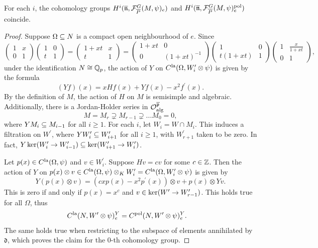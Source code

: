 \documentclass[10pt]{amsart}
\begin{document}
\begin{lemma}
For each $i$, the cohomology groups $H^{i}(\overline{\mathfrak{n}},\mathcal{F}_{\overline{P}}^{G}(M,\psi)_{e})$ and $H^{i}(\overline{\mathfrak{n}},\mathcal{F}_{\overline{P}}^{G}(M,\psi)^{\textnormal{pol}}_{e})$ coincide.
\end{lemma}
\begin{proof}
Suppose $\Omega\subseteq N$ is a compact open neighbourhood of $e$. Since \[
    \begin{pmatrix}
    1 & x \\ 0 & 1
    \end{pmatrix} \begin{pmatrix}
    1 & 0 \\ t & 1
    \end{pmatrix} = \begin{pmatrix}
    1+xt & x \\ t & 1
    \end{pmatrix} = \begin{pmatrix}
    1+xt & 0 \\ 0 & (1+xt)^{-1}
    \end{pmatrix} \begin{pmatrix}
    1 & 0 \\ t(1+xt) & 1
    \end{pmatrix} \begin{pmatrix}
    1 & \frac{x}{1+xt} \\ 0 & 1
    \end{pmatrix}, 
\] under the identification $N\cong \mathbb{Q}_{p}$, the action of $Y$ on $C^{\textnormal{la}}(\Omega,W^{\prime}_{i}\otimes\psi)$ is given by the formula \begin{equation}\label{eq:Y_action_formula}
    (Yf)(x) = xHf(x) + Yf(x) - x^{2}f^{\prime}(x). 
\end{equation} 
By the definition of $M$, the action of $H$ on $M$ is semisimple and algebraic. Additionally, there is a Jordan-Holder series in $\mathcal{O}_{\textnormal{alg}}^{\overline{\mathfrak{p}}}$ \[
    M= M_{r} \supsetneq M_{r-1} \supsetneq ... M_{0} = 0,
\] where $YM_{i} \subseteq M_{i-1}$ for all $i\geq 1$. For each $i$, let $W_{i}=W\cap M_{i}$. This induces a filtration on $W^{\prime}$, where $YW^{\prime}_{i}\subseteq W^{\prime}_{i+1}$ for all $i\geq 1$, with $W^{\prime}_{r+1}$ taken to be zero. In fact, $Y\ker(W_{i}^{\prime}\rightarrow W_{i-1}^{\prime}) \subseteq \ker(W_{i+1}^{\prime}\rightarrow W_{i}^{\prime})$.

Let $p(x)\in C^{\textnormal{la}}(\Omega,\psi)$ and $v\in W^{\prime}_{i}$. Suppose $Hv=cv$ for some $c\in \mathbb{Z}$. Then the action of $Y$ on $p(x)\otimes v\in C^{\textnormal{la}}(\Omega,\psi)\otimes_{K}W^{\prime}_{i}= C^{\textnormal{la}}(\Omega,W^{\prime}_{i}\otimes\psi) $ is given by \[
    Y(p(x)\otimes v)= (cxp(x)-x^2p^{\prime}(x))\otimes v + p(x)\otimes Yv.
\] This is zero if and only if $p(x)=x^c$ and $v\in \ker(W^{\prime}\rightarrow W_{r-1}^{\prime})$. This holds true for all $\Omega$, thus \begin{align*}
    C^{\textnormal{la}}(N,W^{\prime}\otimes\psi)^{Y}_{e} &= C^{\textnormal{pol}}(N,W^{\prime}\otimes\psi)^{Y}_{e}.
\end{align*} The same holds true when restricting to the subspace of elements annihilated by $\mathfrak{d}$, which proves the claim for the $0$-th cohomology group. 


\end{proof}
\end{document}
